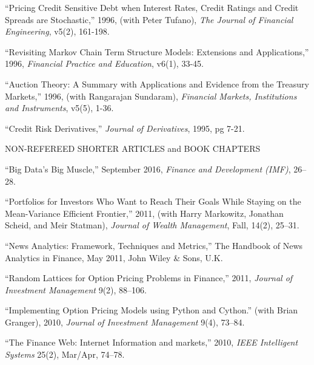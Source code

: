 \documentclass{article}
\begin{document}
\begin{etaremune}
\item
``Pricing Credit Sensitive Debt when Interest Rates, Credit Ratings
and Credit Spreads are Stochastic,'' 1996, 
(with Peter Tufano), {\it The Journal of Financial Engineering},
v5(2), 161-198.

\item
``Revisiting Markov Chain Term Structure Models: Extensions and
Applications,'' 1996, {\it Financial Practice and Education}, v6(1), 33-45.  

\item
``Auction Theory: A Summary with Applications and Evidence
from the Treasury Markets,'' 1996, (with Rangarajan Sundaram),
{\it Financial Markets, Institutions and Instruments}, v5(5), 1-36.

\item
``Credit Risk Derivatives,'' {\it Journal of Derivatives}, 1995, pg 7-21. 



\begin{description}
\item[NON-REFEREED SHORTER ARTICLES and BOOK CHAPTERS] \mbox{}
\end{description}


\item ``Big Data's Big Muscle,'' September 2016, {\it Finance and Development (IMF)}, 26--28. 

\item ``Portfolios for Investors Who Want to Reach Their Goals While Staying on the Mean-Variance Efficient Frontier,'' 2011, (with Harry Markowitz, Jonathan Scheid, and Meir Statman), {\it Journal of Wealth Management}, Fall, 14(2), 25--31.

\item ``News Analytics: Framework, Techniques and Metrics,'' The Handbook of News Analytics in Finance, May 2011, John Wiley \& Sons, U.K. 

\item ``Random Lattices for Option Pricing Problems in Finance,'' 2011, {\it Journal of Investment Management} 9(2), 88--106. 

\item ``Implementing Option Pricing Models using Python and Cython.''
(with Brian Granger), 2010, {\it Journal of Investment Management} 9(4), 73--84. 


\item ``The Finance Web: Internet Information and markets,'' 2010, {\it IEEE Intelligent Systems} 25(2), Mar/Apr, 74--78. 


\end{etaremune}
\end{document}
